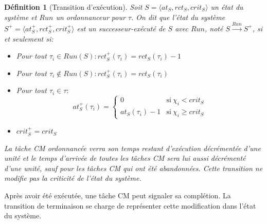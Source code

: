 \documentclass[12pt,a4paper,oneside]{book}
\theoremstyle{break}
\newtheorem{defin}{Définition}[chapter]
\theoremstyle{breakplain}
\begin{document}
\begin{defin}[Transition d'exécution]
\label{per:t:exe}
Soit $S = \langle at_S, rct_S, crit_S \rangle$ un état du système et $Run$ un \textit{ordonnanceur} pour $\tau$. On dit que l'état du système $S^+ = \langle at_S^+, rct_S^+, crit_S^+ \rangle$ est un \textit{successeur-exécuté} de $S$ avec $Run$, noté $S\xrightarrow{Run}S^+$, si et seulement si:
\begin{itemize}
\item Pour tout $\tau_i \in Run(S) : rct_S^+(\tau_i) = rct_S(\tau_i)-1$
\item Pour tout $\tau_i \not \in Run(S) : rct_S^+(\tau_i) = rct_S(\tau_i)$
\item Pour tout $\tau_i \in \tau :$
$$ at_S^+(\tau_i) = \left\{
    \begin{array}{ll}
        0 & \mbox{si}\ \chi_i < crit_S \\
        at_S(\tau_i)-1 & \mbox{si}\ \chi_i \geq crit_S 
    \end{array}
\right.
$$
\item $crit_{S}^{+} = crit_{S}$
\end{itemize}

La tâche CM ordonnancée verra son temps restant d'exécution décrémentée d'une unité et le temps d'arrivée de toutes les tâches CM sera lui aussi décrémenté d'une unité, sauf pour les tâches CM qui ont été abandonnées. Cette transition ne modifie pas la criticité de l'état du système.

\end{defin}
Après avoir été exécutée, une tâche CM peut signaler sa complétion. La transition de terminaison se charge de représenter cette modification dans l'état du système.\\
\end{document}
